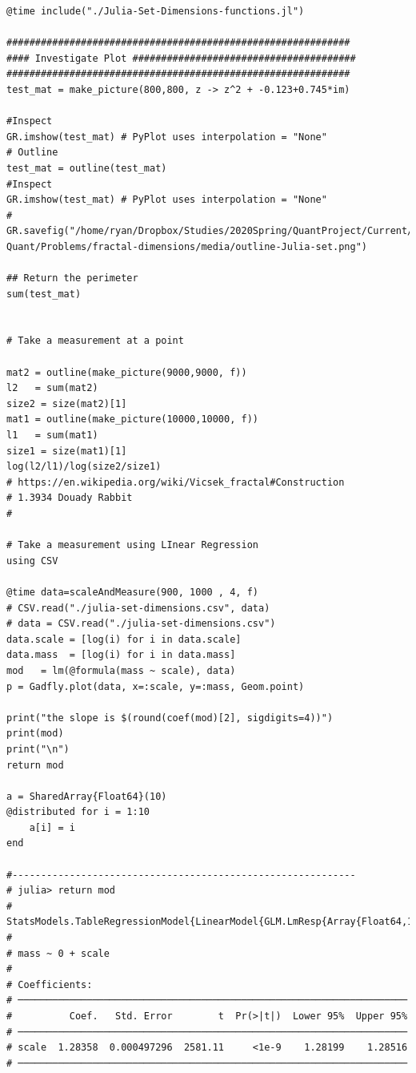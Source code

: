 \documentclass[a4paper,11pt,twoside]{article}
\begin{document}
\begin{verbatim}
@time include("./Julia-Set-Dimensions-functions.jl")

############################################################
#### Investigate Plot #######################################
############################################################
test_mat = make_picture(800,800, z -> z^2 + -0.123+0.745*im)

#Inspect
GR.imshow(test_mat) # PyPlot uses interpolation = "None"
# Outline
test_mat = outline(test_mat)
#Inspect
GR.imshow(test_mat) # PyPlot uses interpolation = "None"
# GR.savefig("/home/ryan/Dropbox/Studies/2020Spring/QuantProject/Current/Python-Quant/Problems/fractal-dimensions/media/outline-Julia-set.png")

## Return the perimeter
sum(test_mat)


# Take a measurement at a point

mat2 = outline(make_picture(9000,9000, f))
l2   = sum(mat2)
size2 = size(mat2)[1]
mat1 = outline(make_picture(10000,10000, f))
l1   = sum(mat1)
size1 = size(mat1)[1]
log(l2/l1)/log(size2/size1)
# https://en.wikipedia.org/wiki/Vicsek_fractal#Construction
# 1.3934 Douady Rabbit
#

# Take a measurement using LInear Regression
using CSV

@time data=scaleAndMeasure(900, 1000 , 4, f)
# CSV.read("./julia-set-dimensions.csv", data)
# data = CSV.read("./julia-set-dimensions.csv")
data.scale = [log(i) for i in data.scale]
data.mass  = [log(i) for i in data.mass]
mod   = lm(@formula(mass ~ scale), data)
p = Gadfly.plot(data, x=:scale, y=:mass, Geom.point)

print("the slope is $(round(coef(mod)[2], sigdigits=4))")
print(mod)
print("\n")
return mod

a = SharedArray{Float64}(10)
@distributed for i = 1:10
    a[i] = i
end

#------------------------------------------------------------
# julia> return mod
# StatsModels.TableRegressionModel{LinearModel{GLM.LmResp{Array{Float64,1}},GLM.DensePredChol{Float64,LinearAlgebra.Cholesky{Float64,Array{Float64,2}}}},Array{Float64,2}}
#
# mass ~ 0 + scale
#
# Coefficients:
# ────────────────────────────────────────────────────────────────────
#          Coef.   Std. Error        t  Pr(>|t|)  Lower 95%  Upper 95%
# ────────────────────────────────────────────────────────────────────
# scale  1.28358  0.000497296  2581.11     <1e-9    1.28199    1.28516
# ────────────────────────────────────────────────────────────────────

\end{verbatim}
\end{document}
